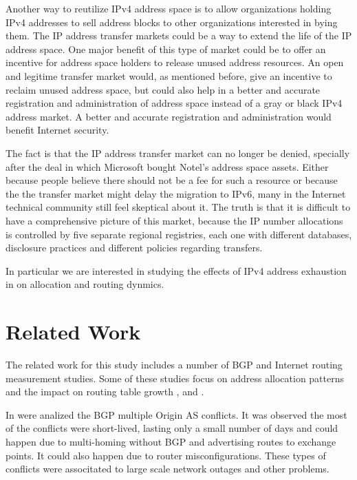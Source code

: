 \documentclass[11pt,a4paper]{scrreprt}
\begin{document}
Another way to reutilize IPv4 address space is to allow organizations holding IPv4 addresses to sell address blocks to other organizations interested in bying them. The IP address transfer markets could be a way to extend the life of the IP address space. One major benefit of this type of market could be to offer an incentive for address space holders to release unused address resources. An open and legitime transfer market would, as mentioned before, give an incentive to reclaim unused address space, but could also help in a better and accurate registration and administration of address space instead of a gray or black IPv4 address market. A better and accurate registration and administration would benefit Internet security.  

The fact is that the IP address transfer market can no longer be denied, specially after the deal in which Microsoft bought Notel's address space assets. Either because people believe there should not be a fee for such a resource or because the the transfer market might delay the migration to IPv6, many in the Internet technical community still feel skeptical about it. The truth is that it is difficult to have a comprehensive picture of this market, because the IP number allocations is controlled by five separate regional registries, each one with different databases, disclosure practices and different policies regarding transfers. 

In particular we are interested in studying the effects of IPv4 address exhaustion in on allocation and routing dynmics.

\chapter{Related Work}

The related work for this study includes a number of BGP and Internet routing measurement studies. Some of these studies focus on address allocation patterns and the impact on routing table growth \cite{Impact_Structure_Routing_Tables}, \cite{Slowing_Routing_Table_Growth} and \cite{BGP_Routing_Table_Evolution}.

In \cite{MOAS} were analized the BGP multiple Origin AS conflicts. It was observed the most of the conflicts were short-lived, lasting only a small number of days and could happen due to multi-homing without BGP and advertising routes to exchange points. It could also happen due to router misconfigurations. These types of conflicts were associtated to large scale network outages and other problems. 
\end{document}

